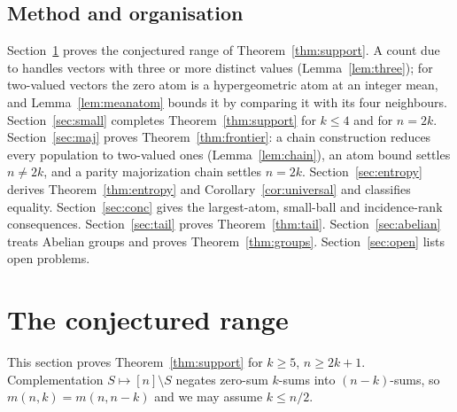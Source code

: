 \documentclass[11pt]{article}
\theoremstyle{remark}
\begin{document}
\subsection{Method and organisation}
Section~\ref{sec:support} proves the conjectured range of
Theorem~\ref{thm:support}. A count due to \cite{MVV} handles vectors with three
or more distinct values (Lemma~\ref{lem:three}); for two-valued vectors the
zero atom is a hypergeometric atom at an integer mean, and
Lemma~\ref{lem:meanatom} bounds it by comparing it with its four neighbours.
Section~\ref{sec:small} completes Theorem~\ref{thm:support} for \(k\le4\) and
for \(n=2k\). Section~\ref{sec:maj} proves Theorem~\ref{thm:frontier}: a chain
construction reduces every population to two-valued ones
(Lemma~\ref{lem:chain}), an atom bound settles \(n\ne2k\), and a parity
majorization chain settles \(n=2k\). Section~\ref{sec:entropy} derives
Theorem~\ref{thm:entropy} and Corollary~\ref{cor:universal} and classifies
equality. Section~\ref{sec:conc} gives the largest-atom, small-ball and
incidence-rank consequences. Section~\ref{sec:tail} proves
Theorem~\ref{thm:tail}. Section~\ref{sec:abelian} treats Abelian groups and
proves Theorem~\ref{thm:groups}. Section~\ref{sec:open} lists open problems.

\section{The conjectured range}\label{sec:support}

This section proves Theorem~\ref{thm:support} for \(k\ge5\), \(n\ge2k+1\).
Complementation \(S\mapsto[n]\setminus S\) negates zero-sum \(k\)-sums into
\((n-k)\)-sums, so \(m(n,k)=m(n,n-k)\) and we may assume \(k\le n/2\).
\end{document}
